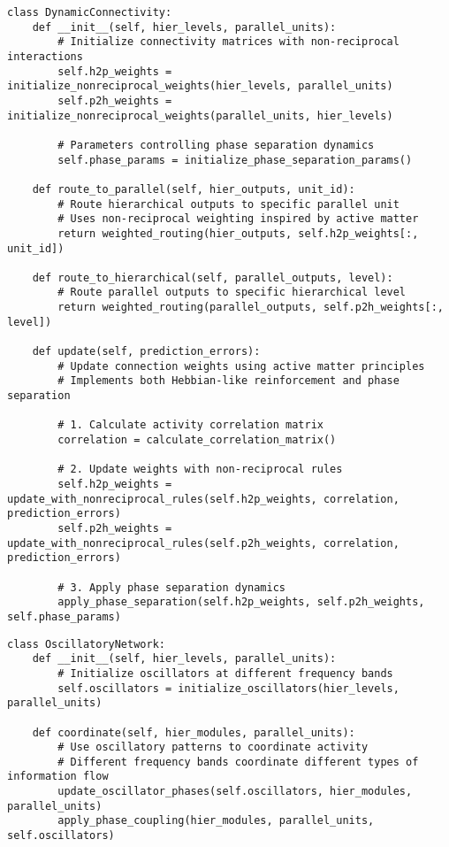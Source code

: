 \documentclass[11pt,a4paper,twocolumn]{article}
\begin{document}
\begin{lstlisting}[caption={Dynamic Connectivity Implementation}, label={lst:dynamic-connectivity}]
class DynamicConnectivity:
    def __init__(self, hier_levels, parallel_units):
        # Initialize connectivity matrices with non-reciprocal interactions
        self.h2p_weights = initialize_nonreciprocal_weights(hier_levels, parallel_units)
        self.p2h_weights = initialize_nonreciprocal_weights(parallel_units, hier_levels)

        # Parameters controlling phase separation dynamics
        self.phase_params = initialize_phase_separation_params()

    def route_to_parallel(self, hier_outputs, unit_id):
        # Route hierarchical outputs to specific parallel unit
        # Uses non-reciprocal weighting inspired by active matter
        return weighted_routing(hier_outputs, self.h2p_weights[:, unit_id])

    def route_to_hierarchical(self, parallel_outputs, level):
        # Route parallel outputs to specific hierarchical level
        return weighted_routing(parallel_outputs, self.p2h_weights[:, level])

    def update(self, prediction_errors):
        # Update connection weights using active matter principles
        # Implements both Hebbian-like reinforcement and phase separation

        # 1. Calculate activity correlation matrix
        correlation = calculate_correlation_matrix()

        # 2. Update weights with non-reciprocal rules
        self.h2p_weights = update_with_nonreciprocal_rules(self.h2p_weights, correlation, prediction_errors)
        self.p2h_weights = update_with_nonreciprocal_rules(self.p2h_weights, correlation, prediction_errors)

        # 3. Apply phase separation dynamics
        apply_phase_separation(self.h2p_weights, self.p2h_weights, self.phase_params)
\end{lstlisting}

\begin{lstlisting}[caption={Oscillatory Synchronization Implementation}, label={lst:oscillatory-network}]
class OscillatoryNetwork:
    def __init__(self, hier_levels, parallel_units):
        # Initialize oscillators at different frequency bands
        self.oscillators = initialize_oscillators(hier_levels, parallel_units)

    def coordinate(self, hier_modules, parallel_units):
        # Use oscillatory patterns to coordinate activity
        # Different frequency bands coordinate different types of information flow
        update_oscillator_phases(self.oscillators, hier_modules, parallel_units)
        apply_phase_coupling(hier_modules, parallel_units, self.oscillators)
\end{lstlisting}
\end{document}
